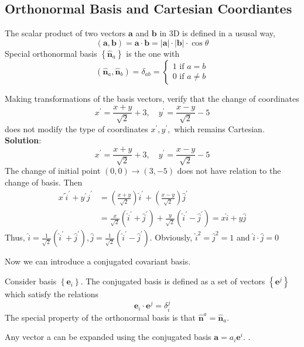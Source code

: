 \subsection{Orthonormal Basis and Cartesian Coordiantes}
The scalar product of two vectors $\mathbf{a}$ and $\mathbf{b}$ in 3D is defined in a ususal way,
\begin{equation}
(\mathbf{a}, \mathbf{b})=\mathbf{a}\cdot\mathbf{b}=|\mathbf{a}| \cdot|\mathbf{b}| \cdot \cos \theta
\end{equation}
Special orthonormal basis $\left\{\hat{\mathbf{n}}_{a}\right\}$ is the one with
\begin{equation}
\left(\hat{\mathbf{n}}_{a}, \hat{\mathbf{n}}_{b}\right)=\delta_{a b}=\left\{\begin{array}{l}
{1 \text { if } a=b} \\
{0 \text { if } a \neq b}
\end{array}\right.
\end{equation}
\begin{example}
Making transformations of the basis vectors, verify that the change of coordinates
$$
x^{\prime}=\frac{x+y}{\sqrt{2}}+3, \quad y^{\prime}=\frac{x-y}{\sqrt{2}}-5
$$
does not modify the type of coordinates $x^{\prime}, y^{\prime},$ which remains Cartesian.
\textbf{Solution}:
$$
x^{\prime}=\frac{x+y}{\sqrt{2}}+3, \quad y^{\prime}=\frac{x-y}{\sqrt{2}}-5
$$
The change of initial point $(0,0) \rightarrow(3,-5)$ does not have relation to the change of basis. Then
$$
\begin{aligned}
x^{\prime} \hat{i}^{\prime}+y^{\prime} \hat{j}^{\prime} &=\left(\frac{x+y}{\sqrt{2}}\right) \hat{i}^{\prime}+\left(\frac{x-y}{\sqrt{2}}\right) \hat{j}^{\prime} \\
&=\frac{x}{\sqrt{2}}\left(\hat{i}^{\prime}+\hat{j}^{\prime}\right)+\frac{y}{\sqrt{2}}\left(\hat{i}^{\prime}-\hat{j}^{\prime}\right)=x \hat{i}+y \hat{j}
\end{aligned}
$$
Thus, $\hat{i}=\frac{1}{\sqrt{2}}\left(\hat{i}^{\prime}+\hat{j}^{\prime}\right), \hat{j}=\frac{1}{\sqrt{2}}\left(\hat{i}^{\prime}-\hat{j}^{\prime}\right) .$ Obviously, $\hat{i}^{2}=\hat{j}^{2}=1$ and $\hat{i} \cdot \hat{j}=0$
\end{example}
Now we can introduce a conjugated covariant basis.
\begin{qt}
Consider basis $\left\{\mathbf{e}_{i}\right\} .$ The conjugated basis is defined as a set of vectors $\left\{\mathbf{e}^{j}\right\}$ which satisfy the relations
\begin{equation}
\mathbf{e}_{i} \cdot \mathbf{e}^{j}=\delta_{i}^{j}
\end{equation}
The special property of the orthonormal basis is that $\hat{\mathbf{n}}^{a}=\hat{\mathbf{n}}_{a}$.

Any vector a can be expanded using the conjugated basis $\mathbf{a}=a_{i} \mathbf{e}^{i} .$ .
\end{qt}
